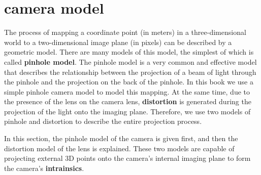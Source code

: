 \section{camera model}
The process of mapping a coordinate point (in meters) in a three-dimensional world to a two-dimensional image plane (in pixels) can be described by a geometric model. There are many models of this model, the simplest of which is called \textbf{pinhole model}. The pinhole model is a very common and effective model that describes the relationship between the projection of a beam of light through the pinhole and the projection on the back of the pinhole. In this book we use a simple pinhole camera model to model this mapping. At the same time, due to the presence of the lens on the camera lens, \textbf{distortion} is generated during the projection of the light onto the imaging plane. Therefore, we use two models of pinhole and distortion to describe the entire projection process.

In this section, the pinhole model of the camera is given first, and then the distortion model of the lens is explained. These two models are capable of projecting external 3D points onto the camera's internal imaging plane to form the camera's \textbf{intrainsics}.







%
